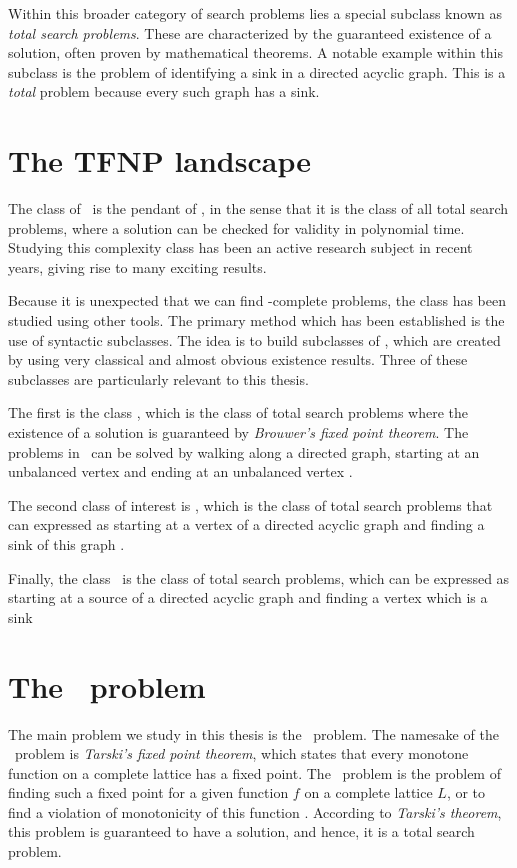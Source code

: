 Within this broader category of search problems lies a special subclass known as \emph{total search problems}. These are characterized by the guaranteed existence of a solution, often proven by mathematical theorems. A notable example within this subclass is the problem of identifying a sink in a directed acyclic graph. This is a \textit{total} problem because every such graph has a sink.

\section{The TFNP landscape}

The class of \TFNP\ is the pendant of \NP, in the sense that it is the class of all total search problems, where a solution can be checked for validity in polynomial time. Studying this complexity class has been an active research subject in recent years, giving rise to many exciting results.

Because it is unexpected that we can find \TFNP-complete problems, the class has been studied using other tools. The primary method which has been established is the use of syntactic subclasses. The idea is to build subclasses of \TFNP, which are created by using very classical and almost obvious existence results. Three of these subclasses are particularly relevant to this thesis.

The first is the class \PPAD, which is the class of total search problems where the existence of a solution is guaranteed by \textit{Brouwer's fixed point theorem}. The problems in \PPAD\ can be solved by walking along a directed graph, starting at an unbalanced vertex and ending at an unbalanced vertex .

The second class of interest is \PLS, which is the class of total search problems that can expressed as starting at a vertex of a directed acyclic graph and finding a sink of this graph .

Finally, the class \EOPL\ is the class of total search problems, which can be expressed as starting at a source of a directed acyclic graph and finding a vertex which is a sink 

\section{The \Tarski\ problem}

The main problem we study in this thesis is the \Tarski\ problem. The namesake of the \Tarski\ problem is \textit{Tarski's fixed point theorem}, which states that every monotone function on a complete lattice has a fixed point. The \Tarski\ problem is the problem of finding such a fixed point for a given function $f$ on a complete lattice $L$, or to find a violation of monotonicity of this function . According to \textit{Tarski's theorem}, this problem is guaranteed to have a solution, and hence, it is a total search problem.

